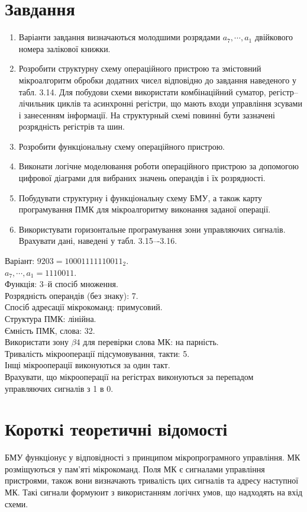 \documentclass[a4paper, 10pt]{article}
\begin{document}
\section{Завдання}
\begin{enumerate}
    \item Варіанти завдання визначаються молодшими розрядами $a_{7},\cdots,a_{1}$ двійкового номера залікової книжки.
    \item Розробити структурну схему операційного пристрою та змістовний мікроалгоритм обробки додатних чисел відповідно до завдання наведеного у табл. 3.14. Для побудови схеми використати комбінаційний суматор, регістр--лічильник циклів та асинхронні регістри, що мають входи управління зсувами і занесенням інформації. На структурный схемі повинні бути зазначені розрядність регістрів та шин.
    \item Розробити функціональну схему операційного пристрою.
    \item Виконати логічне моделювання роботи операційного пристрою за допомогою цифрової діаграми для вибраних значень операндів і їх розрядності.
	\item Побудувати структурну і функціональну схему БМУ, а також карту програмування ПМК для мікроалгоритму виконання заданої операції.
	\item Використувати горизонтальне програмування зони управляючих сигналів. Врахувати дані, наведені у табл. 3.15–-3.16.
\end{enumerate}

\noindent
Варіант: $9203=10001111110011_2$.\\
$a_{7},\cdots,a_{1}=1110011.$\\
Функція: 3--й спосіб множення.\\
Розрядність операндів (без знаку): 7.\\
Спосіб адресації мікрокоманд: примусовий.\\
Структура ПМК: лінійна.\\
Ємність ПМК, слова: 32.\\
Використати зону $\beta4$ для перевірки слова МК: на парність.\\
Тривалість мікрооперації підсумовування, такти: 5.\\
Інщі мікрооперації виконуються за один такт.\\
Врахувати, що мікрооперації на регістрах виконуються за перепадом управляючих сигналів з 1 в 0.

\section{Короткі теоретичні відомості}
БМУ функціонує у відповідності з принципом мікропрограмного управління. МК розміщуються у пам’яті мікрокоманд. Поля МК є сигналами управління пристроями, також
вони визначають тривалість цих сигналів та адресу наступної МК. Такі сигнали формуюит з використанням логічнх умов, що надходять на вхід схеми.
\end{document}
